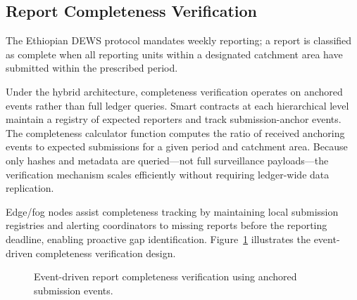 \subsection{Report Completeness Verification}\label{subsec:completeness}

The Ethiopian DEWS protocol mandates weekly reporting; a report is classified as complete when all reporting units within a designated catchment area have submitted within the prescribed period.

Under the hybrid architecture, completeness verification operates on anchored events rather than full ledger queries. Smart contracts at each hierarchical level maintain a registry of expected reporters and track submission-anchor events. The completeness calculator function computes the ratio of received anchoring events to expected submissions for a given period and catchment area. Because only hashes and metadata are queried---not full surveillance payloads---the verification mechanism scales efficiently without requiring ledger-wide data replication.

Edge/fog nodes assist completeness tracking by maintaining local submission registries and alerting coordinators to missing reports before the reporting deadline, enabling proactive gap identification. Figure~\ref{fig:completeness} illustrates the event-driven completeness verification design.

\begin{figure}[!ht]
\centering
{}
\caption{Event-driven report completeness verification using anchored submission events.}\label{fig:completeness}
\end{figure}

%
%
%

